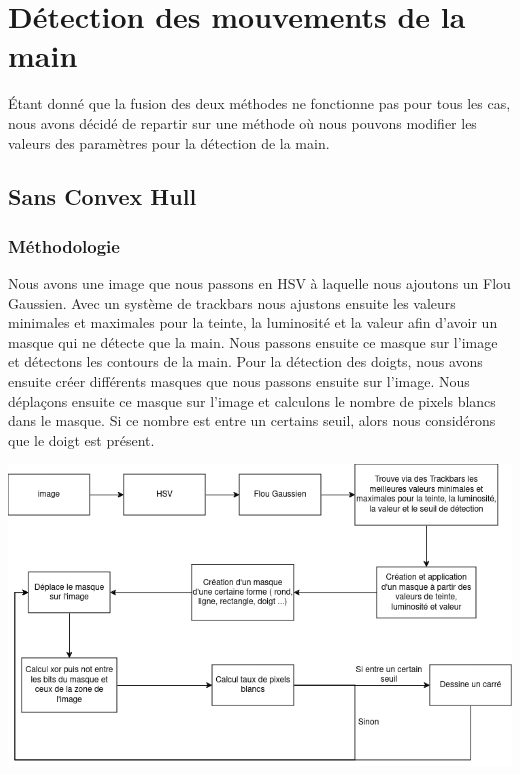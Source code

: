 \documentclass[11pt]{article}
\begin{document}
\bigbreak


\newpage

\section{Détection des mouvements de la main}
\'Etant donné que la fusion des deux méthodes ne fonctionne pas pour tous les cas, nous avons décidé de repartir sur une méthode où nous pouvons modifier les valeurs des paramètres pour la détection de la main.

\subsection{Sans Convex Hull}

\subsubsection{Méthodologie}
Nous avons une image que nous passons en HSV à laquelle nous ajoutons un Flou Gaussien. Avec un système de trackbars nous ajustons ensuite les valeurs minimales et maximales pour la teinte, la luminosité et la valeur afin d'avoir un masque qui ne détecte que la main. Nous passons ensuite ce masque sur l'image et détectons les contours de la main. Pour la détection des doigts, nous avons ensuite créer différents masques que nous passons ensuite sur l'image. Nous déplaçons ensuite ce masque sur l'image et calculons le nombre de pixels blancs dans le masque. Si ce nombre est entre un certains seuil, alors nous considérons que le doigt est présent. \bigbreak

\begin{center}
    \includegraphics[width=\textwidth]{images/pipeline_detect_fingers_sans_convex_hull.png}
    \label{fig:pipeline_detect_fingers_sans_convex_hull}
\end{center}
\end{document}
